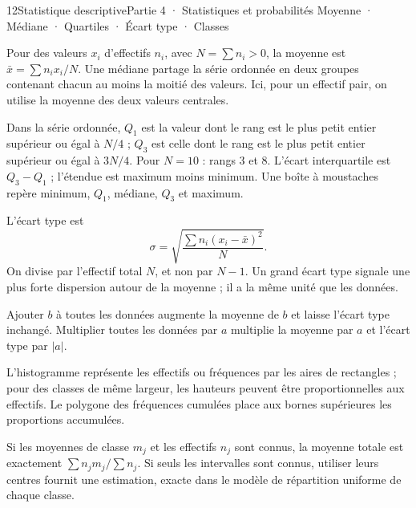 \begin{ouverture}[statistique]{12}{Statistique descriptive}{Partie 4 · Statistiques et probabilités}
{Moyenne · Médiane · Quartiles · Écart type · Classes}
\end{ouverture}
\pagestyle{otMain}\essentiel\fontsize{11}{15}\selectfont
{}
\begin{definition}Pour des valeurs $x_i$ d’effectifs $n_i$, avec $N=\sum n_i>0$, la moyenne est $\bar x=\sum n_ix_i/N$. Une médiane partage la série ordonnée en deux groupes contenant chacun au moins la moitié des valeurs. Ici, pour un effectif pair, on utilise la moyenne des deux valeurs centrales.\end{definition}
\begin{definition}Dans la série ordonnée, $Q_1$ est la valeur dont le rang est le plus petit entier supérieur ou égal à $N/4$ ; $Q_3$ est celle dont le rang est le plus petit entier supérieur ou égal à $3N/4$. Pour $N=10$ : rangs 3 et 8. L’écart interquartile est $Q_3-Q_1$ ; l’étendue est maximum moins minimum. Une boîte à moustaches repère minimum, $Q_1$, médiane, $Q_3$ et maximum.\end{definition}
\begin{definition}L’écart type est
\[\sigma=\sqrt{\frac{\sum n_i(x_i-\bar x)^2}{N}}.\]
On divise par l’effectif total $N$, et non par $N-1$. Un grand écart type signale une plus forte dispersion autour de la moyenne ; il a la même unité que les données.
\end{definition}
\begin{propriete}Ajouter $b$ à toutes les données augmente la moyenne de $b$ et laisse l’écart type inchangé. Multiplier toutes les données par $a$ multiplie la moyenne par $a$ et l’écart type par $|a|$.\end{propriete}
\clearpage
{}
\begin{savoirfaire}
L’histogramme représente les effectifs ou fréquences par les aires de rectangles ; pour des classes de même largeur, les hauteurs peuvent être proportionnelles aux effectifs. Le polygone des fréquences cumulées place aux bornes supérieures les proportions accumulées.
\end{savoirfaire}
\begin{propriete}Si les moyennes de classe $m_j$ et les effectifs $n_j$ sont connus, la moyenne totale est exactement $\sum n_jm_j/\sum n_j$. Si seuls les intervalles sont connus, utiliser leurs centres fournit une estimation, exacte dans le modèle de répartition uniforme de chaque classe.\end{propriete}
